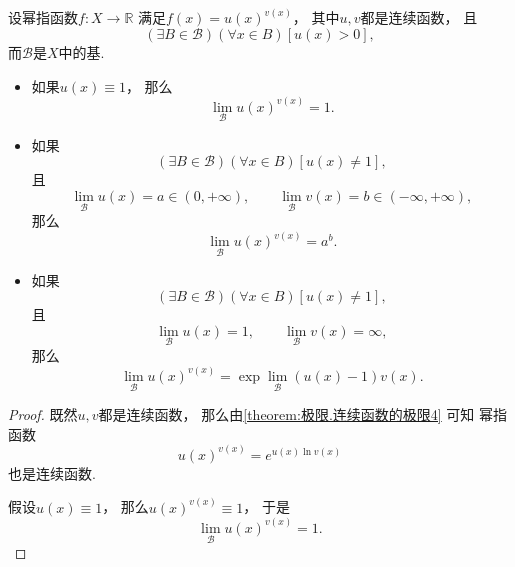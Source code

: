 \begin{proposition}[幂指函数的极限]\label{theorem:幂指函数.幂指函数的极限}
设幂指函数\(f\colon X\to\mathbb{R}\)
满足\(f(x) = u(x)^{v(x)}\)，
其中\(u,v\)都是连续函数，
且\begin{equation*}
	(\exists B\in\mathcal{B})
	(\forall x \in B)
	[u(x)>0],
\end{equation*}
而\(\mathcal{B}\)是\(X\)中的基.
\begin{itemize}
	\item 如果\(u(x) \equiv 1\)，
	那么\begin{equation*}
		\lim_\mathcal{B} u(x)^{v(x)} = 1.
	\end{equation*}

	\item 如果\begin{equation*}
		(\exists B\in\mathcal{B})
		(\forall x \in B)
		[u(x)\neq1],
	\end{equation*}且\begin{equation*}
		\lim_\mathcal{B} u(x) = a \in (0,+\infty), \qquad
		\lim_\mathcal{B} v(x) = b \in (-\infty,+\infty),
	\end{equation*}
	那么\begin{equation*}
		\lim_\mathcal{B} u(x)^{v(x)} = a^b.
	\end{equation*}

	\item 如果\begin{equation*}
		(\exists B\in\mathcal{B})
		(\forall x \in B)
		[u(x)\neq1],
	\end{equation*}且\begin{equation*}
		\lim_\mathcal{B} u(x) = 1, \qquad
		\lim_\mathcal{B} v(x) = \infty,
	\end{equation*}
	那么\begin{equation*}
		\lim_\mathcal{B} u(x)^{v(x)}
		= \exp\lim_\mathcal{B} (u(x)-1) v(x).
	\end{equation*}
\end{itemize}
\begin{proof}
既然\(u,v\)都是连续函数，
那么由\cref{theorem:极限.连续函数的极限4} 可知
幂指函数\begin{equation*}
	u(x)^{v(x)} = e^{u(x) \ln v(x)}
\end{equation*}也是连续函数.

假设\(u(x) \equiv 1\)，
那么\(u(x)^{v(x)} \equiv 1\)，
于是\begin{equation*}
	\lim_\mathcal{B} u(x)^{v(x)} = 1.
\end{equation*}


\end{proof}
\end{proposition}
